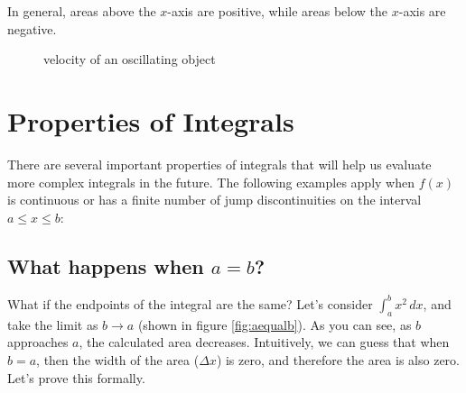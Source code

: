 In general, areas above the $x$-axis are positive, while areas below 
the $x$-axis are negative.

\begin{figure}[htbp]
	\caption{velocity of an oscillating object}
	\label{fig:oscillate}
\end{figure}

\section{Properties of Integrals}
There are several important properties of integrals that will help us 
evaluate more complex integrals in the future. The following examples 
apply when $f(x)$ is continuous or has a finite number of jump 
discontinuities on the interval $a \leq x \leq b$:

\subsection{What happens when $a=b$?}

What if the endpoints of the integral are the same? Let's consider 
$\int_a^b x^2\,dx$, and take the limit as $b \to a$ (shown in figure 
\ref{fig:aequalb}). As you can see, as $b$ approaches $a$, the 
calculated area decreases. Intuitively, we can guess that when $b=a$, 
then the width of the area ($\Delta x$) is zero, and therefore the 
area is also zero. Let's prove this formally. 


